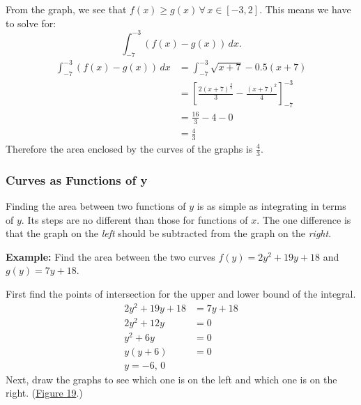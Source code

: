 \documentclass[12pt]{article}
\begin{document}
\begin{enumerate}
                    From the graph, we see that $f(x) \ge g(x) \, \forall \, x \in [-3, 2]$. This means we have to solve for:
                    \[ \int_{-7}^{-3} \left( f(x) - g(x) \right) \, dx. \]
                    \begin{align*}
                        \int_{-7}^{-3} \left( f(x) - g(x) \right) \, dx &= \int_{-7}^{-3} \sqrt{x+7} - 0.5(x+7) \\[6pt]
                        &= \left[ \frac{2(x+7)^\frac{3}{2}}{3} - \frac{(x+7)^2}{4} \right]_{-7}^{-3} \\[6pt]
                        &= \frac{16}{3} - 4 - 0 \\[6pt]
                        &= \frac{4}{3}
                    \end{align*}
                    Therefore the area enclosed by the curves of the graphs is $\frac{4}{3}$.
                \end{enumerate}

            \subsubsection{Curves as Functions of y}
                Finding the area between two functions of $y$ is as simple as integrating in terms of $y$. Its steps are no different than those for functions of $x$. The one difference is that the graph on the \textit{left} should be subtracted from the graph on the \textit{right}.

                \noindent \textbf{Example:} Find the area between the two curves $f(y)=2y^2 + 19y + 18$ and $g(y)=7y + 18$.

                \noindent First find the points of intersection for the upper and lower bound of the integral.
                \begin{align*}
                    2y^2 + 19y + 18 &= 7y + 18 \\
                    2y^2 + 12y &= 0 \\
                    y^2 + 6y &= 0 \\
                    y(y+6) &= 0 \\
                    y = -6, \, 0
                \end{align*}
                Next, draw the graphs to see which one is on the left and which one is on the right. (\hyperref[fig:abcy1]{Figure 19}.)
\end{document}
